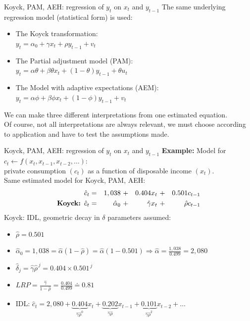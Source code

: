 \documentclass{beamer}
\begin{document}
\begin{frame}{Koyck, PAM, AEH: regression of $y_t$ on $x_t$ and $y_{t-1}$}
The same underlying regression model (statistical form) is used:
\begin{itemize}
\item The Koyck transformation:\\
$y_t = \alpha_0 + \gamma x_t + \rho y_{t-1} + v_t$\\
\smallskip
\item The Partial adjustment model (PAM):\\
$y_t = \alpha \theta + \beta \theta x_t + (1-\theta) y_{t-1} + \theta u_t$\\
\smallskip
\item The Model with adaptive expectations (AEM):\\
$y_t = \alpha \phi + \beta \phi x_{t} + (1-\phi) y_{t-1} + v_t $\\

\end{itemize}
\vspace{0.3cm}
We can make three different interpretations from one estimated equation.\\
\vspace{0.3cm}
Of course, not all interpretations are always relevant, we must choose according to application and have to test the assumptions made.
\end{frame}
\begin{frame}{Koyck, PAM, AEH: regression of $y_t$ on $x_t$ and $y_{t-1}$}
\textbf{Example:} Model for $c_t \leftarrow f(x_t,x_{t-1},x_{t-2},\dots)$:\\
private consumption $(c_t)$ as a function of disposable income $(x_t)$.\\
Same estimated model for Koyck, PAM, AEH:
\begin{equation*}
\begin{aligned}
\hat{c}_t & = &1,038~&+ &0.404 x_t~ &+ &0.501 c_{t-1} \\
\textnormal{\textbf{Koyck:}} \,\,\, \hat{c}_t & = &\hat{\alpha}_0~&+ &\hat{\gamma} x_t~ &+ &\hat{\rho} c_{t-1} 
\end{aligned}
\end{equation*}
Koyck: IDL, geometric decay in $\delta$ parameters assumed:
\begin{itemize}
\item $\hat{\rho}=0.501$
\smallskip
\item $\hat{\alpha}_0 = 1,038 = \hat{\alpha}(1-\hat{\rho}) = \hat{\alpha}(1-0.501) 
\Rightarrow \hat{\alpha}= \frac{1,038}{0.499}=2,080$
\item $\hat{\delta}_j = \hat{\gamma} \hat{\rho}^{\,j}=0.404 \times 0.501^{\,j}$
\smallskip
\item $\textit{LRP}=\frac{\hat{\gamma}}{1-\hat{\rho}}= \frac{0.404}{0.499} \doteq 0.81 $
\smallskip
\item IDL: $\hat{c}_t = 2,080 + \underbrace{0.404}_{\hat{\gamma} \hat{\rho}^{0}} x_t + \underbrace{0.202}_{\hat{\gamma} \hat{\rho}} x_{t-1} 
+ \underbrace{0.101}_{\hat{\gamma} \hat{\rho}^{2}} x_{t-2} + \dots$
\end{itemize}
\end{frame}
\end{document}
